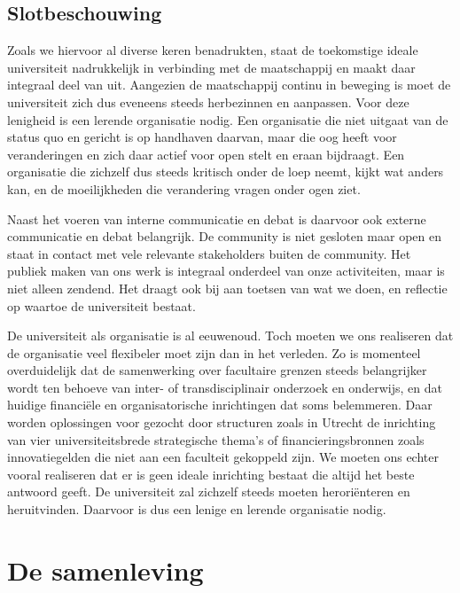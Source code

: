 \documentclass[empirical, authordate, ]{new-jote-article}
\begin{document}
	\section{Slotbeschouwing}



	Zoals we hiervoor al diverse keren benadrukten, staat de toekomstige ideale universiteit nadrukkelijk in verbinding met de maatschappij en maakt daar integraal deel van uit. Aangezien de maatschappij continu in beweging is moet de universiteit zich dus eveneens steeds herbezinnen en aanpassen. Voor deze lenigheid is een lerende organisatie nodig. Een organisatie die niet uitgaat van de status quo en gericht is op handhaven daarvan, maar die oog heeft voor veranderingen en zich daar actief voor open stelt en eraan bijdraagt. Een organisatie die zichzelf dus steeds kritisch onder de loep neemt, kijkt wat anders kan, en de moeilijkheden die verandering vragen onder ogen ziet.



	Naast het voeren van interne communicatie en debat is daarvoor ook externe communicatie en debat belangrijk. De community is niet gesloten maar open en staat in contact met vele relevante stakeholders buiten de community. Het publiek maken van ons werk is integraal onderdeel van onze activiteiten, maar is niet alleen zendend. Het draagt ook bij aan toetsen van wat we doen, en reflectie op waartoe de universiteit bestaat.



	De universiteit als organisatie is al eeuwenoud. Toch moeten we ons realiseren dat de organisatie veel flexibeler moet zijn dan in het verleden. Zo is momenteel overduidelijk dat de samenwerking over facultaire grenzen steeds belangrijker wordt ten behoeve van inter- of transdisciplinair onderzoek en onderwijs, en dat huidige financiële en organisatorische inrichtingen dat soms belemmeren. Daar worden oplossingen voor gezocht door structuren zoals in Utrecht de inrichting van vier universiteitsbrede strategische thema's of financieringsbronnen zoals innovatiegelden die niet aan een faculteit gekoppeld zijn. We moeten ons echter vooral realiseren dat er is geen ideale inrichting bestaat die altijd het beste antwoord geeft. De universiteit zal zichzelf steeds moeten heroriënteren en heruitvinden. Daarvoor is dus een lenige en lerende organisatie nodig.







	\chapter{De samenleving }
\end{document}
